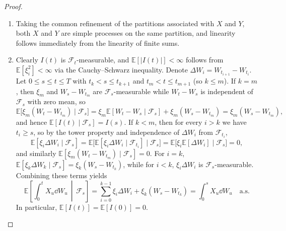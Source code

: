 \begin{proof}
\begin{enumerate}
    \item Taking the common refinement of the partitions associated with $X$ and $Y$, both $X$ and $Y$ are simple processes on the same partition, and linearity follows immediately from the linearity of finite sums.

    \item Clearly $I(t)$ is $\mathcal{F}_t$-measurable, and $\mathbb{E}[|I(t)|] < \infty$ follows from $\mathbb{E}[\xi_i^2] < \infty$ via the Cauchy--Schwarz inequality. Denote $\Delta W_i = W_{t_{i+1}} - W_{t_i}$. Let $0 \le s \le t \le T$ with $t_k < s \le t_{k+1}$ and $t_m < t \le t_{m+1}$ (so $k \le m$). If $k = m$, then $\xi_m$ and $W_s - W_{t_m}$ are $\mathcal{F}_s$-measurable while $W_t - W_s$ is independent of $\mathcal{F}_s$ with zero mean, so
    \[
    \mathbb{E}\big[\xi_m(W_t - W_{t_m}) \mid \mathcal{F}_s\big] = \xi_m \mathbb{E}[W_t - W_s \mid \mathcal{F}_s] + \xi_m(W_s - W_{t_m}) = \xi_m(W_s - W_{t_m}),
    \]
    and hence $\mathbb{E}[I(t) \mid \mathcal{F}_s] = I(s)$. If $k < m$, then for every $i > k$ we have $t_i \ge s$, so by the tower property and independence of $\Delta W_i$ from $\mathcal{F}_{t_i}$,
    \[
    \mathbb{E}[\xi_i \Delta W_i \mid \mathcal{F}_s] = \mathbb{E}\big[\mathbb{E}[\xi_i \Delta W_i \mid \mathcal{F}_{t_i}] \mid \mathcal{F}_s\big] = \mathbb{E}\big[\xi_i \mathbb{E}[\Delta W_i] \mid \mathcal{F}_s\big] = 0,
    \]
    and similarly $\mathbb{E}[\xi_m(W_t - W_{t_m}) \mid \mathcal{F}_s] = 0$. For $i = k$, $\mathbb{E}[\xi_k \Delta W_k \mid \mathcal{F}_s] = \xi_k(W_s - W_{t_k})$, while for $i < k$, $\xi_i \Delta W_i$ is $\mathcal{F}_s$-measurable. Combining these terms yields
    \[
    \mathbb{E}\left[\int_0^t X_u \dd W_u \,\middle|\, \mathcal{F}_s\right] = \sum_{i=0}^{k-1} \xi_i \Delta W_i + \xi_k(W_s - W_{t_k}) = \int_0^s X_u \dd W_u \quad \text{a.s.}
    \]
    In particular, $\mathbb{E}[I(t)] = \mathbb{E}[I(0)] = 0$.


\end{enumerate}
\end{proof}
